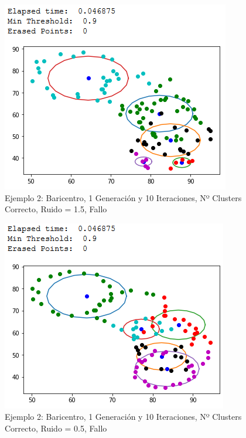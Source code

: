 \documentclass[conference,a4paper]{IEEEtran}
\begin{document}
\begin{figure}[H]
\centering
\includegraphics[scale=0.65]{Experimentacion/Ejemplo2/ej2_b_1_10_mr_wrong}
\caption{Ejemplo 2: Baricentro, 1 Generación y 10 Iteraciones,  Nº Clusters Correcto, Ruido = 1.5, Fallo\\}
\end{figure}

\begin{figure}[H]
\centering
\includegraphics[scale=0.65]{Experimentacion/Ejemplo2/ej2_b_1_10_lr_wrong}
\caption{Ejemplo 2: Baricentro, 1 Generación y 10 Iteraciones,  Nº Clusters Correcto, Ruido = 0.5, Fallo\\}
\end{figure}
\end{document}
